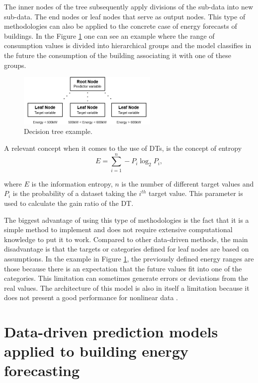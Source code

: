 The inner nodes of the tree subsequently apply divisions of the sub-data into new sub-data. The end nodes or leaf nodes that serve as output nodes. 
This type of methodologies can also be applied to the concrete case of energy forecasts of buildings. In the Figure \ref{dt} one can see an example where the range of consumption values is divided into hierarchical groups and the model classifies in the future the consumption of the building associating it with one of these groups.


\begin{figure}[h!]
    \centering
    \begin{center}
    \includegraphics[width=0.6\textwidth]{Images/DT.png}
    \caption{Decision tree example.}
    \label{dt}
    \end{center}
\end{figure}

A relevant concept when it comes to the use of \ac{DT}s, is the concept of entropy
\begin{equation}
       E=\sum_{i=1}^n -P_i\log_2P_i,
\label{entropy}
\end{equation}

where $E$ is the information entropy, $n$ is the number of different target values and $P_i$ is the probability of a dataset taking the $i^{th}$ target value. This parameter is used to calculate the gain ratio of the \ac{DT}.

The biggest advantage of using this type of methodologies is the fact that it is a simple method to implement and does not require extensive computational knowledge to put it to work. Compared to other data-driven methods, the main disadvantage is that the targets or categories defined for leaf nodes are based on assumptions. In the example in Figure \ref{dt}, the previously defined energy ranges are those because there is an expectation that the future values fit into one of the categories. This limitation can sometimes generate errors or deviations from the real values. The architecture of this model is also in itself a limitation because it does not present a good performance for nonlinear data \cite{dt2}.


\section{Data-driven prediction models applied to building energy forecasting \label{c}}

